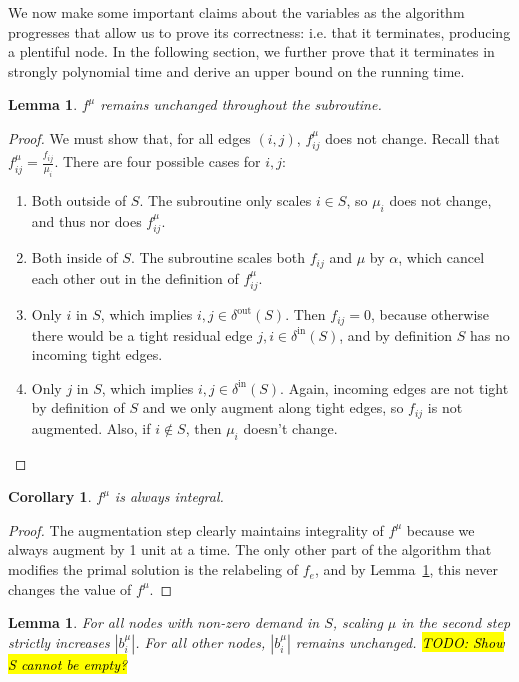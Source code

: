 \documentclass[11pt]{article}
\newtheorem{corollary}{Corollary}[theorem]
\newtheorem{lemma}[theorem]{Lemma}
\theoremstyle{definition}
\theoremstyle{definition}
\newcommand{\biu}{b_{i}^{\mu}}
\newcommand{\din}{\delta^{\text{in}}}
\newcommand{\dout}{\delta^{\text{out}}}
\newcommand{\fiju}{f_{ij}^{\mu}}
\newcommand{\todo}[1]{\hl{TODO: #1}}
\begin{document}
We now make some important claims about the variables as the algorithm
progresses that allow us to prove its correctness: i.e. that it terminates,
producing a plentiful node.
In the following section,
we further prove that it terminates in strongly polynomial time and derive
an upper bound on the running time.

\begin{lemma}
$f^{\mu}$ remains unchanged throughout the subroutine.
\label{lem:fsame}
\end{lemma} 
\begin{proof}
	We must show that, for all edges $(i,j)$, $f_{ij}^{\mu}$ does not change.
	Recall that $f_{ij}^{\mu} = \frac{f_{ij}}{\mu_i}$. There
	are four possible cases for $i,j$:
	\begin{enumerate}
		\item Both outside of $S$. The subroutine only scales $i \in S$, so $\mu_i$ 
			does not change, and thus nor does $\fiju$.
		\item Both inside of $S$. The subroutine scales both $f_{ij}$ and $\mu$ by
			$\alpha$, which cancel each other out in the definition of $\fiju$.
		\item Only $i$ in $S$, which implies $i,j \in \dout(S)$. Then $f_{ij}=0$,
			because otherwise there would be a tight residual edge $j,i \in \din(S)$,
			and by definition $S$ has no incoming tight edges.
		\item Only $j$ in $S$, which implies $i,j \in \din(S)$. Again, incoming edges
			are not tight by definition of $S$ and we only augment along tight edges,
			so $f_{ij}$ is not augmented. Also, if $i \notin S$, then $\mu_i$ doesn't
			change.
	\end{enumerate}
\end{proof}
\begin{corollary}
$f^{\mu}$ is always integral.
\end{corollary}
\begin{proof}
The augmentation step clearly maintains integrality of $f^{\mu}$ because we
always augment by 1 unit at a time. The only other part of the algorithm that
modifies the primal solution is the relabeling of $f_e$, and by
Lemma~\ref{lem:fsame}, this never changes the value of $f^{\mu}$.
\end{proof}
\begin{lemma}
	\label{lem:scaling}
	For all nodes with non-zero demand in $S$, scaling $\mu$ in the second step
	strictly increases $|\biu|$. For all other nodes, $|\biu|$ remains unchanged.
	\todo{Show S cannot be empty?}
\end{lemma}
\end{document}
